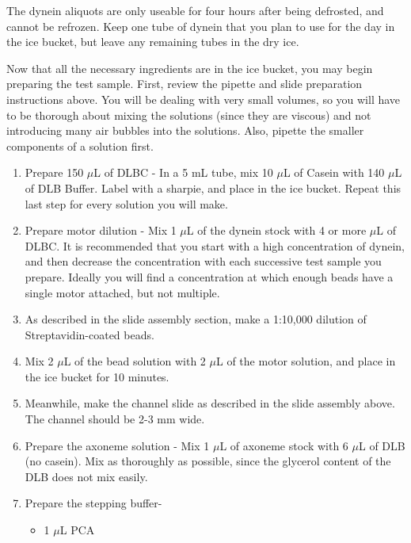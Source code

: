 \documentclass{../lab}
\begin{document}
The dynein aliquots are only useable for four hours after being defrosted, and cannot be refrozen. Keep one tube of dynein that you plan to use for the day in the ice bucket, but leave any remaining tubes in the dry ice.

Now that all the necessary ingredients are in the ice bucket, you may begin preparing the test sample. First, review the pipette and slide preparation instructions above. You will be dealing with very small volumes, so you will have to be thorough about mixing the solutions (since they are viscous) and not introducing many air bubbles into the solutions. Also, pipette the smaller components of a solution first.

\begin{enumerate}
    \item Prepare 150 $\mu$L of DLBC - In a 5 mL tube, mix 10 $\mu$L of Casein with 140 $\mu$L of DLB Buffer. Label with a sharpie, and place in the ice bucket. Repeat this last step for every solution you will make.

    \item Prepare motor dilution - Mix 1 $\mu$L of the dynein stock with 4 or more $\mu$L of DLBC. It is recommended that you start with a high concentration of dynein, and then decrease the concentration with each successive test sample you prepare. Ideally you will find a concentration at which enough beads have a single motor attached, but not multiple.

    \item As described in the slide assembly section, make a 1:10,000 dilution of Streptavidin-coated beads.

    \item Mix 2 $\mu$L of the bead solution with 2 $\mu$L of the motor solution, and place in the ice bucket for 10 minutes.

    \item Meanwhile, make the channel slide as described in the slide assembly above. The channel should be 2-3 mm wide.

    \item Prepare the axoneme solution - Mix 1 $\mu$L of axoneme stock with 6 $\mu$L of DLB (no casein). Mix as thoroughly as possible, since the glycerol content of the DLB does not mix easily.

    \item Prepare the stepping buffer-
    \begin{itemize}
        \item 1 $\mu$L PCA
    

\end{itemize}
\end{enumerate}
\end{document}
